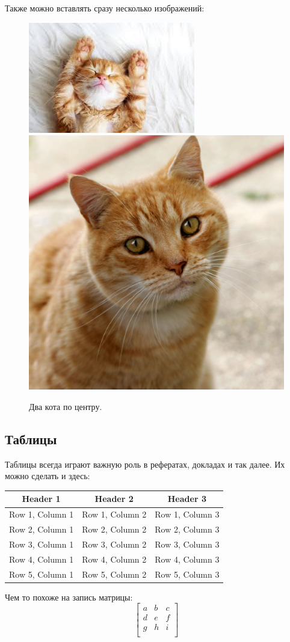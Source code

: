 Также можно вставлять сразу несколько изображений:
\begin{figure}[H]
\centering
\includegraphics[width=0.5\linewidth]{cat1.jpeg}
\includegraphics[width=0.3\linewidth]{cat.jpeg}
\caption{\label{fig:cat}Два кота по центру.}
\end{figure}

\subsection{Таблицы}

Таблицы всегда играют важную роль в рефератах, докладах и так далее. Их можно сделать и здесь:
\begin{table}[h]
    \centering
    \begin{tabular}{|c|c|c|}
        \hline
        Header 1 & Header 2 & Header 3 \\
        \hline
        Row 1, Column 1 & Row 1, Column 2 & Row 1, Column 3 \\
        Row 2, Column 1 & Row 2, Column 2 & Row 2, Column 3 \\
        Row 3, Column 1 & Row 3, Column 2 & Row 3, Column 3 \\
        Row 4, Column 1 & Row 4, Column 2 & Row 4, Column 3 \\
        Row 5, Column 1 & Row 5, Column 2 & Row 5, Column 3 \\
        \hline
    \end{tabular}
\end{table}

Чем то похоже на запись матрицы:
\[
\begin{bmatrix}
a & b & c \\
d & e & f \\
g & h & i \\
\end{bmatrix}
\]

